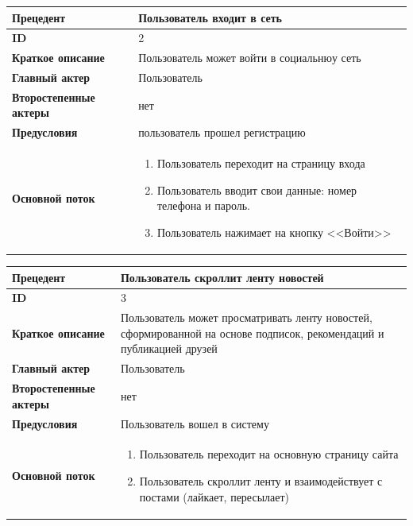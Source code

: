 \begin{center}
  \begin{tabular}{|l|p{9cm}|}
  \hline
  \textbf{Прецедент} & Пользователь входит в сеть \\
  \hline
  \textbf{ID} & 2 \\
  \hline
  \textbf{Краткое описание} & Пользователь может войти в социальнюу сеть \\
  \hline
  \textbf{Главный актер} & Пользователь\\
  \hline
  \textbf{Второстепенные актеры} & нет \\
  \hline
  \textbf{Предусловия} & пользователь прошел регистрацию \\
  \hline
  \textbf{Основной поток} & \begin{enumerate}
    \item Пользователь переходит на страницу входа
    \item Пользователь вводит свои данные: номер телефона и пароль.
    \item Пользователь нажимает на кнопку <<Войти>>
  \end{enumerate} \\
  \hline
\end{tabular}
\end{center}

\begin{center}
  \begin{tabular}{|l|p{9cm}|}
  \hline
  \textbf{Прецедент} & Пользователь скроллит ленту новостей \\
  \hline
  \textbf{ID} & 3 \\
  \hline
  \textbf{Краткое описание} & Пользователь может просматривать ленту новостей, сформированной на основе подписок, рекомендаций и публикацией друзей \\
  \hline
  \textbf{Главный актер} & Пользователь\\
  \hline
  \textbf{Второстепенные актеры} & нет \\
  \hline
  \textbf{Предусловия} & Пользователь вошел в систему \\
  \hline
  \textbf{Основной поток} & \begin{enumerate}
    \item Пользователь переходит на основную страницу сайта
    \item Пользователь скроллит ленту и взаимодействует с постами (лайкает, пересылает)
  \end{enumerate} \\
  \hline
\end{tabular}
\end{center}

